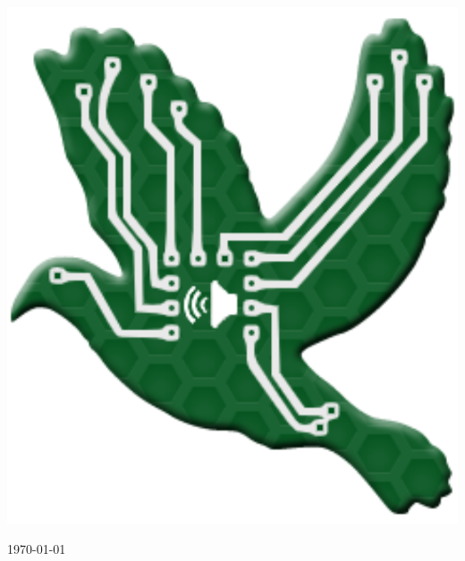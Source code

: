 \documentclass[12pt,journal,compsoc]{IEEEtran}
\begin{document}
\begin{titlepage}
	
	
	\vfill\vfill
	\includegraphics[width=.3\textwidth]{images/logo.png}\\[1cm] %
	
	
	\vfill\vfill\vfill %
	
	{\large\today} %
	 
	
	\vfill %
	
\end{titlepage}

\onecolumn
\tableofcontents
\end{document}
